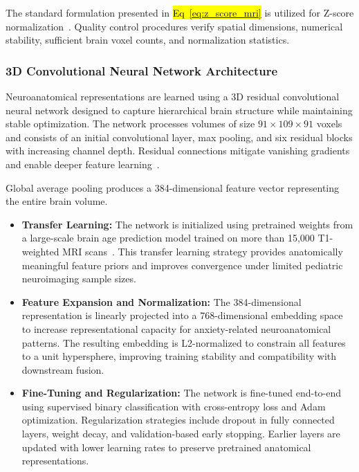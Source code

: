 \documentclass[10pt,letterpaper]{article}
\begin{document}
                                                            The standard formulation presented in \hl{Eq~\ref{eq:z_score_mri}} is utilized for Z-score normalization~\cite{ref47}. Quality control procedures verify spatial dimensions, numerical stability, sufficient brain voxel counts, and normalization statistics.

                                                            \subsubsection*{\textbf{3D Convolutional Neural Network Architecture}}

                                                            Neuroanatomical representations are learned using a 3D residual convolutional neural network designed to capture hierarchical brain structure while maintaining stable optimization. The network processes volumes of size $91 \times 109 \times 91$ voxels and consists of an initial convolutional layer, max pooling, and six residual blocks with increasing channel depth. Residual connections mitigate vanishing gradients and enable deeper feature learning~\cite{ref63}.

                                                            Global average pooling produces a 384-dimensional feature vector representing the entire brain volume.

                                                            \begin{itemize}
                                                                \item \textbf{Transfer Learning:} The network is initialized using pretrained weights from a large-scale brain age prediction model trained on more than 15,000 T1-weighted MRI scans~\cite{ref64}. This transfer learning strategy provides anatomically meaningful feature priors and improves convergence under limited pediatric neuroimaging sample sizes.
                                                                    \item \textbf{Feature Expansion and Normalization:} The 384-dimensional representation is linearly projected into a 768-dimensional embedding space to increase representational capacity for anxiety-related neuroanatomical patterns. The resulting embedding is L2-normalized to constrain all features to a unit hypersphere, improving training stability and compatibility with downstream fusion.
                                                                        \item \textbf{Fine-Tuning and Regularization:} The network is fine-tuned end-to-end using supervised binary classification with cross-entropy loss and Adam optimization. Regularization strategies include dropout in fully connected layers, weight decay, and validation-based early stopping. Earlier layers are updated with lower learning rates to preserve pretrained anatomical representations.
                                                                        \end{itemize}
\end{document}
